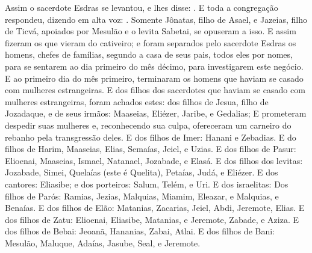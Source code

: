 {  Assim o sacerdote Esdras se levantou, e lhes disse: .
  E toda a congregação respondeu, dizendo em alta voz: .
  Somente Jônatas, filho de Asael, e Jazeias, filho de Ticvá, apoiados por Mesulão e o levita Sabetai, se opuseram a isso.
  E assim fizeram os que vieram do cativeiro; e foram separados pelo sacerdote Esdras os homens, chefes de famílias, segundo a casa de seus pais, todos eles por nomes, para se sentarem ao dia primeiro do mês décimo, para investigarem este negócio.
  E ao primeiro dia do mês primeiro, terminaram {} os homens que haviam se casado com mulheres estrangeiras.
  E dos filhos dos sacerdotes que haviam se casado com mulheres estrangeiras, foram achados estes: dos filhos de Jesua, filho de Jozadaque, e de seus irmãos: Maaseias, Eliézer, Jaribe, e Gedalias;
  E prometeram despedir suas mulheres e, reconhecendo sua culpa, ofereceram um carneiro do rebanho pela transgressão deles.
  E dos filhos de Imer: Hanani e Zebadias.
  E do filhos de Harim, Maaseias, Elias, Semaías, Jeiel, e Uzias.
  E dos filhos de Pasur: Elioenai, Maaseias, Ismael, Natanael, Jozabade, e Elasá.
  E dos filhos dos levitas: Jozabade, Simei, Quelaías (este é Quelita), Petaías, Judá, e Eliézer.
  E dos cantores: Eliasibe; e dos porteiros: Salum, Telém, e Uri.
  E dos {} israelitas: Dos filhos de Parós: Ramias, Jezias, Malquias, Miamim, Eleazar, e Malquias, e Benaías.
  E dos filhos de Elão: Matanias, Zacarias, Jeiel, Abdi, Jeremote, Elias.
  E dos filhos de Zatu: Elioenai, Eliasibe, Matanias, e Jeremote, Zabade, e Aziza.
  E dos filhos de Bebai: Jeoanã, Hananias, Zabai, Atlai.
  E dos filhos de Bani: Mesulão, Maluque, Adaías, Jasube, Seal, e Jeremote.
}
